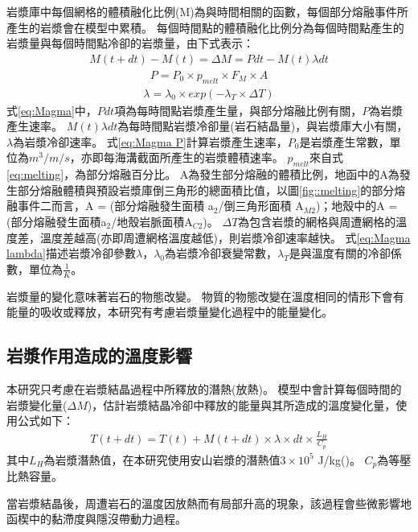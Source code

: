 岩漿庫中每個網格的體積融化比例(M)為與時間相關的函數，每個部分熔融事件所產生的岩漿會在模型中累積。
每個時間點的體積融化比例分為每個時間點產生的岩漿量與每個時間點冷卻的岩漿量，由下式表示：
\begin{align}
    M(t+dt)-M(t) = \Delta M = Pdt-M(t)\lambda dt \label{eq:Magma}
\end{align}
\begin{align}
    P = P_0 \times p_{melt} \times F_M \times A \label{eq:Magma P}
\end{align}
\begin{align}
    \lambda = \lambda_0\times exp(-\lambda_T \times \Delta T) \label{eq:Magma lambda}
\end{align}
式\ref{eq:Magma}中，$Pdt$項為每時間點岩漿產生量，與部分熔融比例有關，$P$為岩漿產生速率。
$M(t)\lambda dt$為每時間點岩漿冷卻量(岩石結晶量)，與岩漿庫大小有關，$\lambda$為岩漿冷卻速率。
式\ref{eq:Magma P}計算岩漿產生速率，$P_0$是岩漿產生常數，單位為$m^3/m/s$，亦即每海溝截面所產生的岩漿體積速率。
$p_{melt}$來自式\ref{eq:melting}，為部分熔融百分比。
A為發生部分熔融的體積比例，地函中的A為發生部分熔融體積與預設岩漿庫倒三角形的總面積比值，以圖\ref{fig::melting}的部分熔融事件二而言，A = (部分熔融發生面積 a$_2$/倒三角形面積 A$_{M2}$)；地殼中的A = (部分熔融發生面積a$_2$/地殼岩脈面積A$_{C2}$)。
$\Delta T$為包含岩漿的網格與周遭網格的溫度差，溫度差越高(亦即周遭網格溫度越低)，則岩漿冷卻速率越快。
式\ref{eq:Magma lambda}描述岩漿冷卻參數$\lambda$，$\lambda_0$為岩漿冷卻衰變常數，$\lambda_T$是與溫度有關的冷卻係數，單位為$\frac{1}{K}$。

岩漿量的變化意味著岩石的物態改變。
物質的物態改變在溫度相同的情形下會有能量的吸收或釋放，本研究有考慮岩漿量變化過程中的能量變化。
\subsection{岩漿作用造成的溫度影響}\label{岩漿作用造成的溫度影響}
本研究只考慮在岩漿結晶過程中所釋放的潛熱(放熱)。
模型中會計算每個時間的岩漿變化量($\Delta M$)，估計岩漿結晶冷卻中釋放的能量與其所造成的溫度變化量，使用公式如下：
\begin{align}
    T(t+dt) = T(t) + M(t+dt)\times \lambda \times dt \times \frac{L_H}{C_p}\label{eq:latent heat}
\end{align}
其中$L_H$為岩漿潛熱值，在本研究使用安山岩漿的潛熱值$3\times 10^5$ J/kg(\citealp{liu2011modeling})。
$C_p$為等壓比熱容量。

當岩漿結晶後，周遭岩石的溫度因放熱而有局部升高的現象，該過程會些微影響地函楔中的黏滯度與隱沒帶動力過程。

